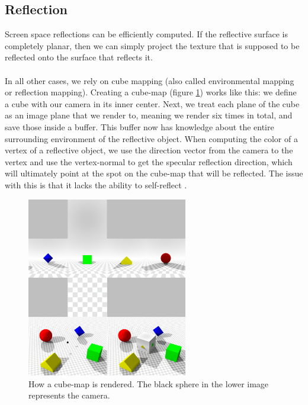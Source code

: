 \documentclass{ACGSeminar}
\begin{document}
	\subsection{Reflection}
		Screen space reflections can be efficiently computed. If the reflective surface is completely planar, then we can simply project the texture that is supposed to be reflected onto the surface that reflects it. \\\\
		In all other cases, we rely on cube mapping (also called environmental mapping or reflection mapping). Creating a cube-map (figure \ref{fig:cube_map}) works like this: we define a cube with our camera in its inner center. Next, we treat each plane of the cube as an image plane that we render to, meaning we render six times in total, and save those inside a buffer. This buffer now has knowledge about the entire surrounding environment of the reflective object. When computing the color of a vertex of a reflective object, we use the direction vector from the camera to the vertex and use the vertex-normal to get the specular reflection direction, which will ultimately point at the spot on the cube-map that will be reflected. The issue with this is that it lacks the ability to self-reflect \cite{REFL}.
		\begin{figure}[htb!]%
			\begin{center}%
				\includegraphics[width=7cm]{img/cube_map.png}
			\end{center}%
			\caption{How a cube-map is rendered. The black sphere in the lower image represents the camera.}%
			\label{fig:cube_map}%
		\end{figure}%
\end{document}
